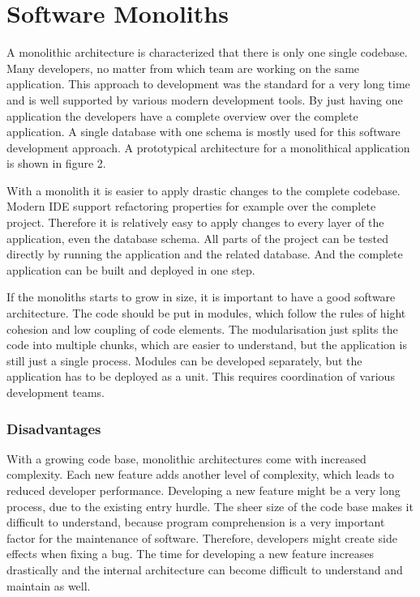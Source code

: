\section{Software Monoliths}

A monolithic architecture is characterized that there is only one single codebase. Many developers, no matter from which team are working on the same application. This approach to development was the standard for a very long time and is well supported by various modern development tools. By just having one application the developers have a complete overview over the complete application. A single database with one schema is mostly used for this software development approach. A prototypical architecture for a monolithical application is shown in figure 2. 

With a monolith it is easier to apply drastic changes to the complete codebase. Modern IDE support refactoring properties for example over the complete project. Therefore it is relatively easy to apply changes to every layer of the application, even the database schema. All parts of the project can be tested directly by running the application and the related database. And the complete application can be built and deployed in one step. \cite{book:2018:richardson:background:bff:microservices-patterns}


If the monoliths starts to grow in size, it is important to have a good software architecture. The code should be put in modules, which follow the rules of hight cohesion and low coupling of code elements. The modularisation just splits the code into multiple chunks, which are easier to understand, but the application is still just a single process. Modules can be developed separately, but the application has to be deployed as a unit. This requires coordination of various development teams. \cite{book:2018:richardson:background:bff:microservices-patterns}


\subsubsection{Disadvantages}


With a growing code base, monolithic architectures come with increased complexity. Each new feature adds another level of complexity, which leads to reduced developer performance. Developing a new feature might be a very long process, due to the existing entry hurdle. The sheer size of the code base makes it difficult to understand, because program comprehension is a very important factor for the maintenance of software. Therefore, developers might create side effects when fixing a bug. The time for developing a new feature increases drastically and the internal architecture can become difficult to understand and maintain as well.

